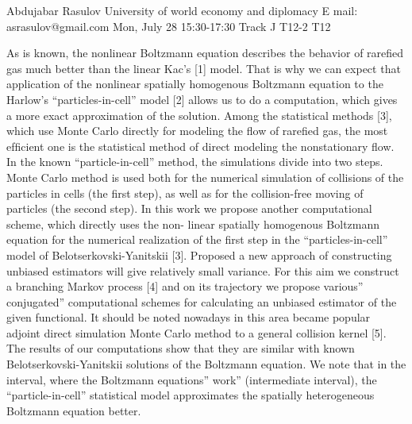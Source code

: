 \begin{talk}
  {Abdujabar Rasulov}%
  {University of world economy and diplomacy}%
  {E mail: asrasulov@gmail.com}%
  {}%
  {}%
  {}%
  {Mon, July 28 15:30-17:30 Track J}%
  {T12-2}%
  {T12}%
 {}%

				
			
As is known, the nonlinear Boltzmann equation describes the behavior of rareﬁed gas much better than the linear Kac’s [1] model. That is why we can expect that application of the nonlinear spatially homogenous Boltzmann equation to the Harlow’s “particles-in-cell” model [2] allows us to do a computation, which gives a more exact approximation of the solution. 
Among the statistical methods [3], which use Monte Carlo directly for modeling the ﬂow of rareﬁed gas, the most efﬁcient one is the statistical method of direct modeling the nonstationary ﬂow. 
In the known “particle-in-cell” method, the simulations divide into two steps. Monte Carlo method is used both for the numerical simulation of collisions of the particles in cells (the ﬁrst step), as well as for the collision-free moving of particles (the second step). 
In this work we propose another computational scheme, which directly uses the non- linear spatially homogenous Boltzmann equation for the numerical realization of the ﬁrst step in the “particles-in-cell” model of Belotserkovski-Yanitskii [3]. Proposed a new approach of constructing unbiased estimators will give relatively small variance.
 For this aim we construct a branching Markov process [4] and on its trajectory we propose various” conjugated” computational schemes for calculating an unbiased estimator of the given functional. It should be noted nowadays in this area became popular adjoint direct simulation Monte Carlo method to a general collision kernel [5].  
The results of our computations show that they are similar with known Belotserkovski-Yanitskii solutions of the Boltzmann equation. We note that in the interval, where the Boltzmann equations” work” (intermediate interval), the “particle-in-cell” statistical model approximates the spatially heterogeneous Boltzmann equation better. 

\medskip


\end{talk}
